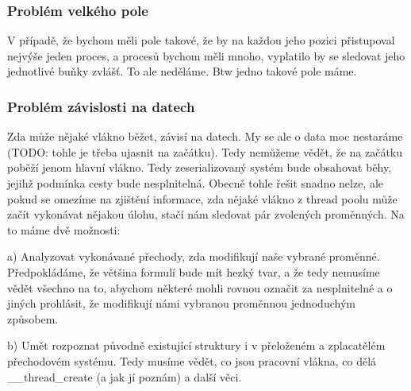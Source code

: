 \documentclass[10pt,a4paper,notitlepage]{article}
\begin{document}
\subsubsection{Problém velkého pole}
V případě, že bychom měli pole takové, že by na každou jeho pozici přistupoval nejvýše jeden proces,
a procesů bychom měli mnoho, vyplatilo by se sledovat jeho jednotlivé buňky zvlášť. To ale neděláme. Btw jedno takové pole máme.

\subsubsection{Problém závislosti na datech}
Zda může nějaké vlákno běžet, závisí na datech. My se ale o data moc nestaráme (TODO: tohle je třeba ujasnit na začátku). Tedy nemůžeme vědět, že na začátku poběží jenom hlavní vlákno. Tedy zeserializovaný systém bude obsahovat běhy, jejihž podmínka cesty bude nesplnitelná. Obecně tohle řešit snadno nelze, ale pokud se omezíme na zjištění informace, zda nějaké vlákno z thread poolu může začít vykonávat nějakou úlohu, stačí nám sledovat pár zvolených proměnných. Na to máme dvě možnosti:

a) Analyzovat vykonávané přechody, zda modifikují naše vybrané proměnné. Předpokládáme, že většina formulí bude mít hezký tvar, a že tedy nemusíme vědět všechno na to, abychom některé mohli rovnou označit za nesplnitelné a o jiných prohlásit, že modifikují námi vybranou proměnnou jednoduchým způsobem.

b) Umět rozpoznat původně existující struktury i v přeloženém a zplacatělém přechodovém systému. Tedy musíme vědět, co jsou pracovní vlákna, co dělá \_\_thread\_create (a jak jí poznám) a další věci.
\end{document}
